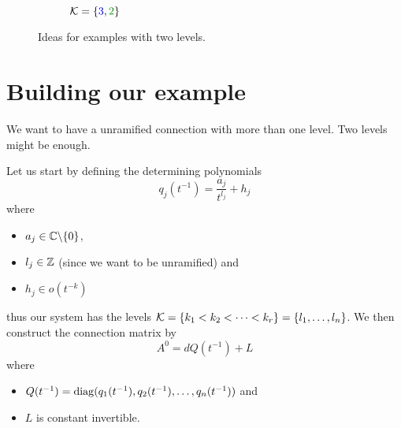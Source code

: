 \begin{figure}[!htbp]
\begin{subfigure}[b]{0.33\textwidth}
    \caption{$\cK=\{\textcolor{blue}{3},\textcolor{green!60!black}{2}\}$}
  \end{subfigure}
  \caption{Ideas for examples with two levels.}
\end{figure} %

\section{Building our example}
We want to have a unramified connection with more than one level. Two levels
might be enough. 

Let us start by defining the determining polynomials
\[
  q_j(t^{-1})=\frac{a_j}{t^{l_j}}+h_j
\]
where 
\begin{itemize}
  \item $a_j\in\mathbb{C}\backslash\{0\}$,
  \item $l_j\in\mathbb{Z}$ (since we want to be unramified) and
  \item $h_j\in o(t^{-k})$ 
\end{itemize}
thus our system has the levels $\mathcal{K}=\{k_1<k_2<\cdots<k_r\}=\{l_1,\dots,l_n\}$.
We then construct the connection matrix by
\[
  A^0=dQ(t^{-1})+L
\]
where
\begin{itemize}
  \item $Q(t^{-1})=\operatorname{diag}(q_1(t^{-1}),q_2(t^{-1}),\dots,q_n(t^{-1}))$
    and
  \item $L$ is constant invertible.
\end{itemize}


